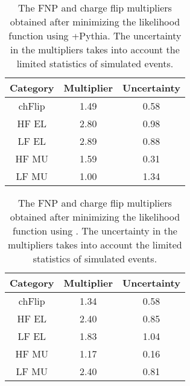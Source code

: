 \begin{table}[!htb]
  \caption{The FNP and charge flip multipliers obtained after minimizing the likelihood function using \POWHEGBOX+Pythia.
    The uncertainty in the multipliers takes into account the limited statistics of simulated events.
    \label{t:fake_factors_powheg}}
  \centering
   \begin{tabular}{|c|c|c|}
          \hline
          Category & Multiplier & Uncertainty  \\
          \hline
          chFlip & 1.49 & 0.58 \\ 
          HF EL & 2.80 & 0.98 \\
          LF EL & 2.89 & 0.88 \\
          HF MU & 1.59 & 0.31 \\
          LF MU & 1.00 & 1.34 \\
          \hline
        \end{tabular}
\end{table}

\begin{table}[!htb]
  \caption{The FNP and charge flip multipliers obtained after minimizing the likelihood function using \SHERPA.
    The uncertainty in the multipliers takes into account the limited statistics of simulated events.
    \label{t:fake_factors_sherpa}}
  \centering
  \begin{tabular}{|c|c|c|}
    \hline
    Category & Multiplier & Uncertainty  \\
    \hline
    chFlip & 1.34 & 0.58 \\ 
    HF EL & 2.40 & 0.85 \\
    LF EL & 1.83 & 1.04 \\
    HF MU & 1.17 & 0.16 \\
    LF MU & 2.40 & 0.81 \\
    \hline
  \end{tabular}                                                                                         
\end{table}
